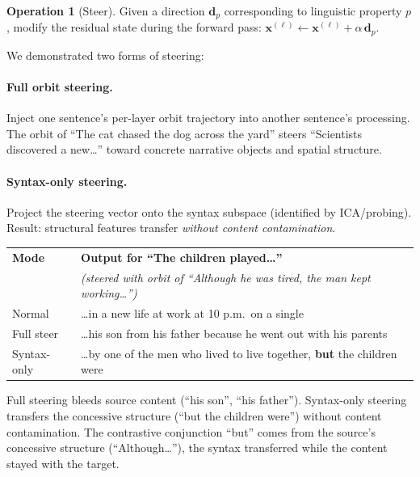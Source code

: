 \documentclass[11pt, a4paper]{article}
\newcommand{\x}{\mathbf{x}}
\theoremstyle{plain}
\theoremstyle{definition}
\newtheorem{operation}{Operation}
\theoremstyle{remark}
\begin{document}
\begin{operation}[Steer]
Given a direction $\mathbf{d}_p$ corresponding to linguistic property $p$, modify the residual state during the forward pass: $\x^{(\ell)} \leftarrow \x^{(\ell)} + \alpha \, \mathbf{d}_p$.
\end{operation}

We demonstrated two forms of steering:

\paragraph{Full orbit steering.}
Inject one sentence's per-layer orbit trajectory into another sentence's processing.
The orbit of ``The cat chased the dog across the yard'' steers ``Scientists discovered a new\ldots'' toward concrete narrative objects and spatial structure.

\paragraph{Syntax-only steering.}
Project the steering vector onto the syntax subspace (identified by ICA/probing).
Result: structural features transfer \emph{without content contamination}.

\begin{center}\small
\begin{tabular}{lp{9cm}}
\toprule
\textbf{Mode} & \textbf{Output for ``The children played\ldots''} \\
& \emph{(steered with orbit of ``Although he was tired, the man kept working\ldots'')} \\
\midrule
Normal & \ldots in a new life at work at 10 p.m.\ on a single \\
Full steer & \ldots his son from his father because he went out with his parents \\
Syntax-only & \ldots by one of the men who lived to live together, \textbf{but} the children were \\
\bottomrule
\end{tabular}
\end{center}

Full steering bleeds source content (``his son'', ``his father'').
Syntax-only steering transfers the concessive structure (``but the children were'') without content contamination.
The contrastive conjunction ``but'' comes from the source's concessive structure (``Although\ldots''), the syntax transferred while the content stayed with the target.
\end{document}
